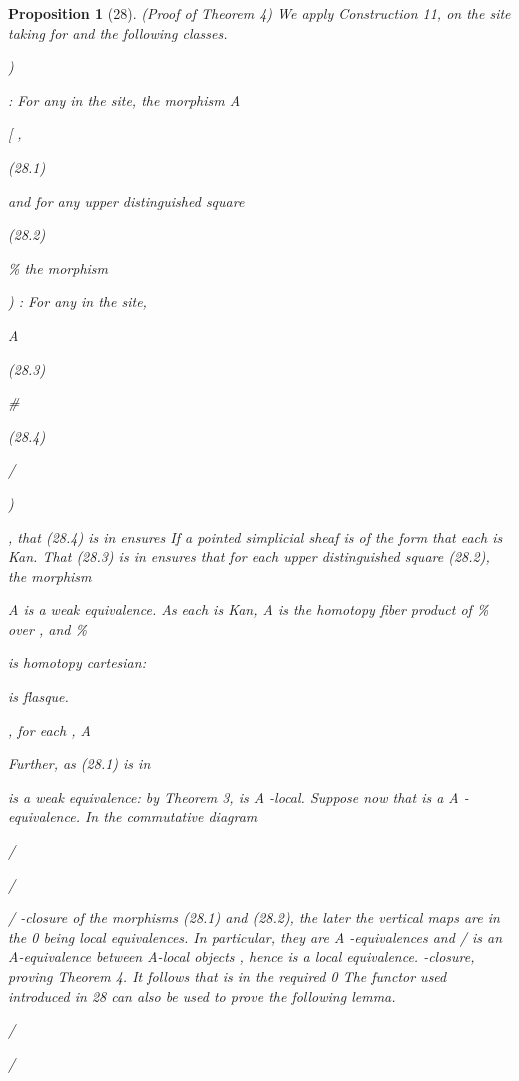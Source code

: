 \documentclass[11pt,a4paper]{article}
\theoremstyle{plain}
\newtheorem{proposition}[theorem]{Proposition}
\theoremstyle{definition}
\begin{document}
\begin{proposition}[28]
(Proof of Theorem 4) We apply Construction 11, on the site
taking for and the following classes.



)

 : For any  in the site, the morphism
  A



[ ,

(28.1)

and for any upper distinguished square

  



(28.2)

\%  
the morphism

) : For any  in the site,

 A



(28.3)

\#



(28.4)

/ 

)

, that (28.4) is in
ensures
If a pointed simplicial sheaf is of the form
that each
is Kan. That (28.3) is in ensures that for each upper distinguished
square (28.2), the morphism





  A   
is a weak equivalence. As each   is Kan,  A    is the homotopy fiber
product of \% over  , and
  \%




  
is homotopy cartesian:

is flasque.




 



 , for each  ,
   A

Further, as (28.1) is in

is a weak equivalence: by Theorem 3, is A -local.
Suppose now that
is a A -equivalence. In the commutative diagram

 /

/

 





/    
 -closure of the morphisms (28.1) and (28.2), the later
the vertical maps are in the 0
being local equivalences. In particular, they are A -equivalences and / 
  is an A-equivalence between A-local objects , hence is a local equivalence.
 -closure, proving Theorem 4.
It follows that  is in the required 0
The functor  used introduced in 28 can also be used to prove the following
lemma.

/

/


\end{proposition}
\end{document}
